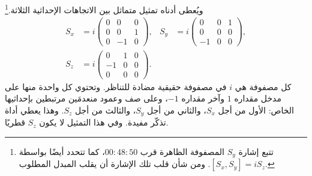 ويُعطى أدناه تمثيل متماثل بين الاتجاهات الإحداثية الثلاثة.\footnote{تتبع إشارة \(S_y\) المصفوفة الظاهرة قرب \(00{:}48{:}50\)، كما تتحدد أيضًا بواسطة \([S_x,S_y]=iS_z\). ومن شأن قلب تلك الإشارة أن يقلب المبدل المطلوب.}
\begin{equation}
\begin{aligned}
S_x
&=
i
\begin{pmatrix}
0&0&0\\
0&0&1\\
0&-1&0
\end{pmatrix},
&
S_y
&=
i
\begin{pmatrix}
0&0&1\\
0&0&0\\
-1&0&0
\end{pmatrix},\\
S_z
&=
i
\begin{pmatrix}
0&1&0\\
-1&0&0\\
0&0&0
\end{pmatrix}.
\end{aligned}
\end{equation}
كل مصفوفة هي \(i\) في مصفوفة حقيقية مضادة للتناظر. وتحتوي كل واحدة منها على مدخل مقداره \(1\) وآخر مقداره \(-1\)، وعلى صف وعمود منعدمَين مرتبطين بإحداثيها الخاص: الأول من أجل \(S_x\)، والثاني من أجل \(S_y\)، والثالث من أجل \(S_z\). وهذا يعطي أداة تذكّر مفيدة. وفي هذا التمثيل لا يكون \(S_z\) قطريًا.

